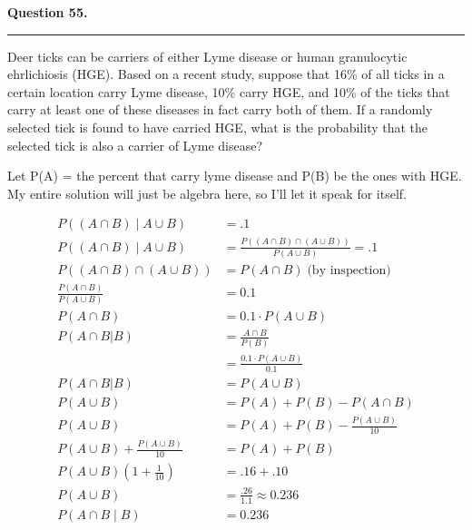 \textbf{Question 55.} \\
\hrule 

Deer ticks can be carriers of either Lyme disease or human granulocytic ehrlichiosis (HGE). Based on a recent study, suppose that 16\% of all ticks in a certain location carry Lyme disease, 10\% carry HGE, and 10\% of the ticks that carry at least one of these diseases in fact carry both of them. If a randomly selected tick is found to have carried HGE, what is the probability that the selected tick is also a carrier of Lyme disease?

Let P(A) = the percent that carry lyme disease and P(B) be the ones with HGE. My entire solution will just be algebra here, so I'll let it speak for itself. 

\begin{align*}
    P((A \cap B) \; | \; A \cup B) &= .1 \\[3mm]
    P((A \cap B) \; | \; A \cup B) &= \frac{P((A \cap B) \cap (A \cup B))}{P(A \cup B)} = .1 \\[3mm]
    P((A \cap B) \cap (A \cup B)) &= P(A \cap B) \; \text{(by inspection)} \\[3mm]
    \frac{P(A \cap B)}{P(A \cup B)} &= 0.1 \\[3mm]
    P(A \cap B) &= 0.1 \cdot P(A \cup B) \\[3mm]
    P(A \cap B | B) &= \frac{A \cap B}{P(B)} \\[3mm]
    &= \frac{0.1 \cdot P(A \cup B)}{0.1} \\[3mm]
    P(A \cap B | B) &= P(A \cup B) \\[3mm]
    P(A \cup B) &= P(A) + P(B) - P(A \cap B) \\[3mm]
    P(A \cup B) &= P(A) + P(B) - \frac{P(A \cup B)}{10} \\[3mm]
    P(A \cup B) + \frac{P(A \cup B)}{10} &= P(A) + P(B) \\[3mm]
    P(A \cup B) \left( 1 + \frac{1}{10} \right) &= .16 + .10 \\[3mm]
    P(A \cup B) &= \frac{.26}{1.1} \approx 0.236 \\[3mm]
    P(A \cap B \; | \; B) &= \boxed{0.236}
\end{align*}